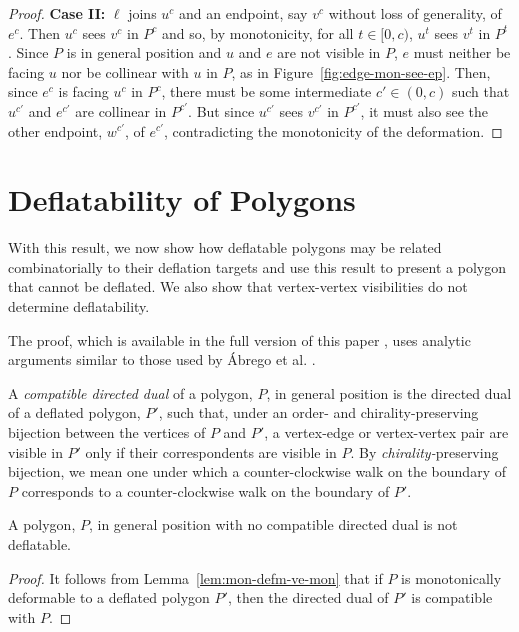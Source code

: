 \documentclass{amsart}
\begin{document}
\begin{proof}
  \noindent\textbf{Case II:} $\ell$ joins $u^c$ and an
  endpoint, say $v^c$ without loss of generality, of $e^c$.  Then
  $u^c$ sees $v^c$ in $P^c$ and so, by monotonicity, for all
  $t\in[0,c)$, $u^t$ sees $v^t$ in $P^t$.  Since $P$ is in general
  position and $u$ and $e$ are not visible in $P$, $e$ must neither be
  facing $u$ nor be collinear with $u$ in $P$, as in
  Figure~\ref{fig:edge-mon-see-ep}.  Then, since $e^c$ is facing $u^c$
  in $P^c$, there must be some intermediate $c'\in(0,c)$ such that
  $u^{c'}$ and $e^{c'}$ are collinear in $P^{c'}$.  But since $u^{c'}$
  sees $v^{c'}$ in $P^{c'}$, it must also see the other endpoint,
  $w^{c'}$, of $e^{c'}$, contradicting the monotonicity of the
  deformation.
\end{proof}

\section{Deflatability of Polygons}

With this result, we now show how deflatable polygons may be related
combinatorially to their deflation targets and use this result to
present a polygon that cannot be deflated.  We also show that
vertex-vertex visibilities do not determine deflatability.

\else %

The proof, which is available in the full version of this
paper \cite{Bose12}, uses analytic arguments similar to those used by
{\'A}brego et al. \cite{Abrego11}.

\fi


A \emph{compatible directed dual} of a polygon, $P$, in general
position is the directed dual of a deflated polygon, $P'$, such that,
under an order- and chirality-preserving bijection between the
vertices of $P$ and $P'$, a vertex-edge or vertex-vertex pair are
visible in $P'$ only if their correspondents are visible in $P$.  By
\emph{chirality-}preserving bijection, we mean one under which a
counter-clockwise walk on the boundary of $P$ corresponds to a
counter-clockwise walk on the boundary of $P'$.

\begin{theorem}
  \label{thm:no-cdd-not-defl}
  A polygon, $P$, in general position with no compatible directed dual
  is not deflatable.
\end{theorem}
\begin{proof}
  It follows from Lemma~\ref{lem:mon-defm-ve-mon} that if $P$ is
  monotonically deformable to a deflated polygon $P'$, then the
  directed dual of $P'$ is compatible with $P$.
\end{proof}
\end{document}
